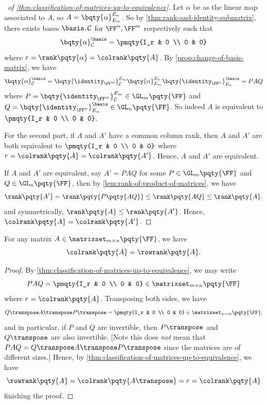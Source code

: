 \begin{proof}[\proofname\ of \autoref{thm:classification-of-matrices-up-to-equivalence}]
    Let \(\alpha\) be as the linear map associated to \(A\), so \(A = \bqty{\alpha}_{E_m}^{E_n}\). So by \autoref{thm:rank-and-identity-submatrix}, there exists bases \(\basis, \mathcal{C}\) for \(\FF^n, \FF^m\) respectively such that
    \[
        \bqty{\alpha}_{\mathcal{C}}^{\basis} = \pmqty{I_r & 0 \\ 0 & 0}
    \]
    where \(r = \rank\pqty{\alpha} = \colrank\pqty{A}\). By \autoref{prop:change-of-basis-matrix}, we have
    \[
        \bqty{\alpha}_{\mathcal{C}}^{\basis} = \bqty{\identity_{\FF^m}}_{\mathcal{C}}^{E_m} \bqty{\alpha}_{E_m}^{E_n} \bqty{\identity_{\FF^n}}_{E_n}^{\basis} = P A Q
    \]
    where \(P = \bqty{\identity_{\FF^m}}_{\mathcal{C}}^{E_m} \in \GL_m\pqty{\FF}\) and \(Q = \bqty{\identity_{\FF^n}}_{E_n}^{\basis} \in \GL_n\pqty{\FF}\). So indeed \(A\) is equivalent to \(\pmqty{I_r & 0 \\ 0 & 0}\).

    For the second part, if \(A\) and \(A'\) have a common column rank, then \(A\) and \(A'\) are both equivalent to \(\pmqty{I_r & 0 \\ 0 & 0}\) where \(r = \colrank\pqty{A} = \colrank\pqty{A'}\). Hence, \(A\) and \(A'\) are equivalent.

    If \(A\) and \(A'\) are equivalent, say \(A' = P A Q\) for some \(P \in \GL_m\pqty{\FF}\) and \(Q \in \GL_n\pqty{\FF}\), then by \autoref{lem:rank-of-product-of-matrices}, we have
    \[
        \rank\pqty{A'} = \rank\pqty{P \pqty{AQ}} \leq \rank\pqty{AQ} \leq \rank\pqty{A}.
    \]
    and symmetrically, \(\rank\pqty{A} \leq \rank\pqty{A'}\). Hence, \(\colrank\pqty{A} = \colrank\pqty{A'}\).
\end{proof}

\begin{theorem}
    \label{thm:row-rank-equals-column-rank}%
    For any matrix \(A \in \matrixset_{m \times n} \pqty{\FF}\), we have
    \[
        \colrank\pqty{A} = \rowrank\pqty{A}.
    \]
\end{theorem}

\begin{proof}
    By \autoref{thm:classification-of-matrices-up-to-equivalence}, we may write
    \[
        PAQ = \pmqty{I_r & 0 \\ 0 & 0} \in \matrixset_{m \times n} \pqty{\FF}
    \]
    where \(r = \colrank\pqty{A}\). Transposing both sides, we have
    \[
        Q\transpose A\transpose P\transpose = \pmqty{I_r & 0 \\ 0 & 0} \in \matrixset_{n \times m} \pqty{\FF},
    \]
    and in particular, if \(P\) and \(Q\) are invertible, then \(P\transpose\) and \(Q\transpose\) are also invertible. [Note this does \emph{not} mean that \(PAQ = Q\transpose A\transpose P\transpose\) since the matrices are of different sizes.] Hence, by \autoref{thm:classification-of-matrices-up-to-equivalence}, we have
    \[
        \rowrank\pqty{A} = \colrank\pqty{A\transpose} = r = \colrank\pqty{A}
    \]
    finishing the proof.
\end{proof}

